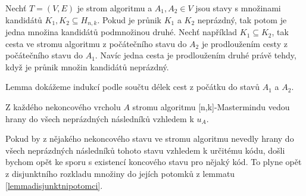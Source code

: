 \begin{lemma}
    Nechť $T = (V,E)$ je strom algoritmu a $A_1, A_2 \in V$ jsou stavy s množinami kandidátů $K_1, K_2 \subseteq H_{n,k}$. Pokud je průnik $K_1$ a $K_2$ neprázdný, tak potom je jedna množina kandidátů podmnožinou druhé. Nechť například $K_1 \subseteq K_2$, tak cesta ve stromu algoritmu z počátečního stavu do $A_2$ je prodloužením cesty z počátečního stavu do $A_1$. Navíc jedna cesta je prodloužením druhé právě tehdy, když je průnik množin kandidátů neprázdný. 
\end{lemma}
\begin{dukaz}
    Lemma dokážeme indukcí podle součtu délek cest z počátku do stavů $A_1$ a $A_2$.
\end{dukaz}


\begin{tvrz}\label{tvrzvsichninaslednici}
    Z každého nekoncového vrcholu $A$ stromu algoritmu [n,k]-Mastermindu vedou hrany do všech neprázdných následníků vzhledem k $u_A$.
    
\end{tvrz}
\begin{dukaz}
    Pokud by z nějakého nekoncového stavu ve stromu algoritmu nevedly hrany do všech neprázdných následníků tohoto stavu vzhledem k určitému kódu, došli bychom opět 
    ke sporu s existencí koncového stavu pro nějaký kód. To plyne opět z disjunktního rozkladu množiny do jejích potomků z lemmatu \ref{lemmadisjunktnipotomci}.
    
    

\end{dukaz}


